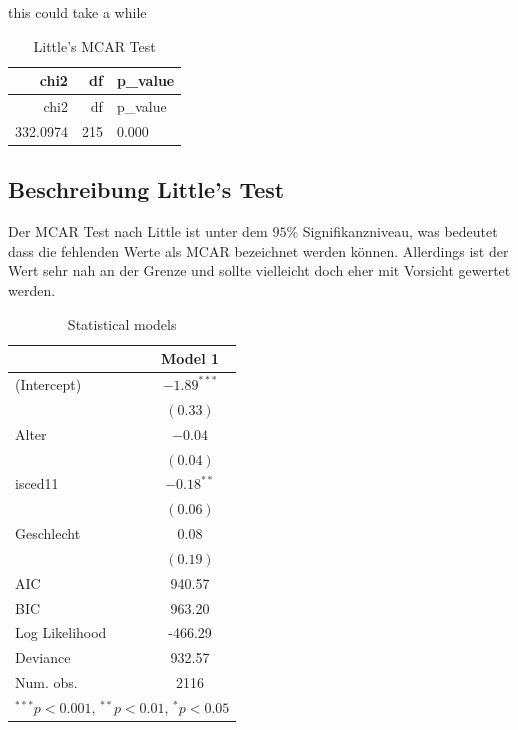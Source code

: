 \documentclass[]{article}
\begin{document}
this could take a while

\begin{longtable}[]{@{}rrl@{}}
\caption{Little's MCAR Test}\tabularnewline
\toprule
chi2 & df & p\_value\tabularnewline
\midrule
\endfirsthead
\toprule
chi2 & df & p\_value\tabularnewline
\midrule
\endhead
332.0974 & 215 & 0.000\tabularnewline
\bottomrule
\end{longtable}

\subsection{\texorpdfstring{\textbf{Beschreibung Little's
Test}}{Beschreibung Little's Test}}\label{beschreibung-littles-test}

Der MCAR Test nach Little ist unter dem \(95\%\) Signifikanzniveau, was
bedeutet dass die fehlenden Werte als MCAR bezeichnet werden können.
Allerdings ist der Wert sehr nah an der Grenze und sollte vielleicht
doch eher mit Vorsicht gewertet werden.

\begin{table}
\begin{center}
\begin{tabular}{l c }
\hline
 & Model 1 \\
\hline
(Intercept)    & $-1.89^{***}$ \\
               & $(0.33)$      \\
Alter          & $-0.04$       \\
               & $(0.04)$      \\
isced11        & $-0.18^{**}$  \\
               & $(0.06)$      \\
Geschlecht     & $0.08$        \\
               & $(0.19)$      \\
\hline
AIC            & 940.57        \\
BIC            & 963.20        \\
Log Likelihood & -466.29       \\
Deviance       & 932.57        \\
Num. obs.      & 2116          \\
\hline
\multicolumn{2}{l}{\scriptsize{$^{***}p<0.001$, $^{**}p<0.01$, $^*p<0.05$}}
\end{tabular}
\caption{Statistical models}
\label{table:coefficients}
\end{center}
\end{table}
\end{document}
